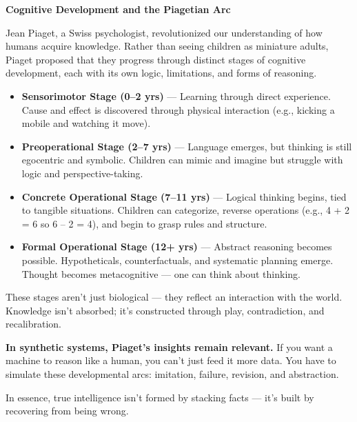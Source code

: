 \begin{PsychologicalSidebar}{\textbf{Cognitive Development and the Piagetian Arc}}

  Jean Piaget, a Swiss psychologist, revolutionized our understanding of how humans acquire knowledge. Rather than seeing children as miniature adults, Piaget proposed that they progress through distinct stages of cognitive development, each with its own logic, limitations, and forms of reasoning.

  \medskip
  
  \begin{itemize}
  \item \textbf{Sensorimotor Stage (0–2 yrs)} — Learning through direct experience. Cause and effect is discovered through physical interaction (e.g., kicking a mobile and watching it move).
  \item \textbf{Preoperational Stage (2–7 yrs)} — Language emerges, but thinking is still egocentric and symbolic. Children can mimic and imagine but struggle with logic and perspective-taking.
  \item \textbf{Concrete Operational Stage (7–11 yrs)} — Logical thinking begins, tied to tangible situations. Children can categorize, reverse operations (e.g., 4 + 2 = 6 so 6 – 2 = 4), and begin to grasp rules and structure.
  \item \textbf{Formal Operational Stage (12+ yrs)} — Abstract reasoning becomes possible. Hypotheticals, counterfactuals, and systematic planning emerge. Thought becomes metacognitive — one can think about thinking.
  \end{itemize}

  \medskip
  
  These stages aren’t just biological — they reflect an interaction with the world. Knowledge isn’t absorbed; it’s constructed through play, contradiction, and recalibration.

  \medskip
  
  \textbf{In synthetic systems, Piaget’s insights remain relevant.} If you want a machine to reason like a human, you can’t just feed it more data. You have to simulate these developmental arcs: imitation, failure, revision, and abstraction.

  \medskip
  
  In essence, true intelligence isn’t formed by stacking facts — it’s built by recovering from being wrong.
  
\end{PsychologicalSidebar}

